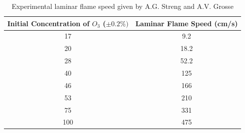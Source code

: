 \begin{table}[h]
\caption {Experimental laminar flame speed given by A.G. Streng and A.V. Grosse\cite{Streng}} \label{tab:title}
\begin{center}

\begin{tabular}{|c|c|}
\hline
 \textbf{ Initial Concentration of $O_3$ ($\pm 0.2 \% )$}  &  \textbf{ Laminar Flame Speed (cm/s)} \\ \hline
 17& 9.2 \\  \hline
 20& 18.2 \\ \hline
 28& 52.2 \\ \hline
 40& 125 \\  \hline
 46&  166 \\ \hline
 53&  210 \\ \hline
 75&  331 \\ \hline
100&  475 \\ \hline
\end{tabular}
\end{center}
\end{table}
 
 
